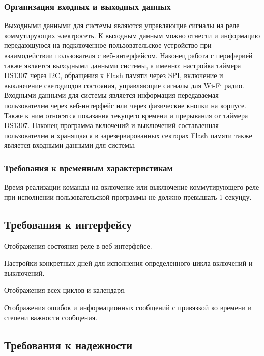 \subsubsection{Организация входных и выходных данных}
Выходными данными для системы являются управляющие сигналы на реле коммутирующих электросеть. К выходным данным можно отнести и информацию передающуюся на подключенное пользовательское устройство при взаимодействии пользователя с веб-интерфейсом. Наконец работа с периферией также является выходными данными системы, а именно: настройка таймера DS1307 через I2C, обращения к Flash памяти через SPI, включение и выключение светодиодов состояния, управляющие сигналы для Wi-Fi радио. Входными данными для системы является информация передаваемая пользователем через веб-интерфейс или через физические кнопки на корпусе. Также к ним относятся показания текущего времени и прерывания от таймера DS1307. Наконец программа включений и выключений составленная пользователем и хранящаяся в зарезервированных секторах Flash памяти также является входными данными для системы.

\subsubsection{Требования к временным характеристикам}
Время реализации команды на включение или выключение коммутирующего реле при исполнении пользовательской программы не должно превышать 1 секунду.


\subsection{Требования к интерфейсу}
\begin{my_enumerate}
\item Отображения состояния реле в веб-интерфейсе.
\item Настройки конкретных дней для исполнения определенного цикла включений и выключений.
\item Отображения всех циклов и календаря.
\item Отображения ошибок и информационных сообщений с привязкой ко времени и степени важности сообщения.
\end{my_enumerate}



\subsection{Требования к надежности}
